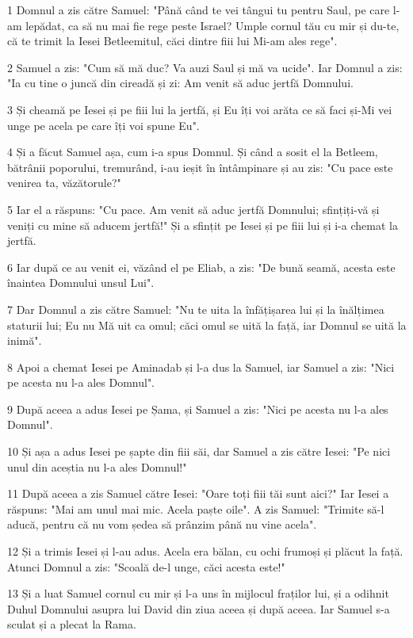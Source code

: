 \par 1 Domnul a zis către Samuel: "Până când te vei tângui tu pentru Saul, pe care l-am lepădat, ca să nu mai fie rege peste Israel? Umple cornul tău cu mir și du-te, că te trimit la Iesei Betleemitul, căci dintre fiii lui Mi-am ales rege".
\par 2 Samuel a zis: "Cum să mă duc? Va auzi Saul și mă va ucide". Iar Domnul a zis: "Ia cu tine o juncă din cireadă și zi: Am venit să aduc jertfă Domnului.
\par 3 Și cheamă pe Iesei și pe fiii lui la jertfă, și Eu îți voi arăta ce să faci și-Mi vei unge pe acela pe care îți voi spune Eu".
\par 4 Și a făcut Samuel așa, cum i-a spus Domnul. Și când a sosit el la Betleem, bătrânii poporului, tremurând, i-au ieșit în întâmpinare și au zis: "Cu pace este venirea ta, văzătorule?"
\par 5 Iar el a răspuns: "Cu pace. Am venit să aduc jertfă Domnului; sfințiți-vă și veniți cu mine să aducem jertfă!" Și a sfințit pe Iesei și pe fiii lui și i-a chemat la jertfă.
\par 6 Iar după ce au venit ei, văzând el pe Eliab, a zis: "De bună seamă, acesta este înaintea Domnului unsul Lui".
\par 7 Dar Domnul a zis către Samuel: "Nu te uita la înfățișarea lui și la înălțimea staturii lui; Eu nu Mă uit ca omul; căci omul se uită la față, iar Domnul se uită la inimă".
\par 8 Apoi a chemat Iesei pe Aminadab și l-a dus la Samuel, iar Samuel a zis: "Nici pe acesta nu l-a ales Domnul".
\par 9 După aceea a adus Iesei pe Șama, și Samuel a zis: "Nici pe acesta nu l-a ales Domnul".
\par 10 Și așa a adus Iesei pe șapte din fiii săi, dar Samuel a zis către Iesei: "Pe nici unul din aceștia nu l-a ales Domnul!"
\par 11 După aceea a zis Samuel către Iesei: "Oare toți fiii tăi sunt aici?" Iar Iesei a răspuns: "Mai am unul mai mic. Acela paște oile". A zis Samuel: "Trimite să-l aducă, pentru că nu vom ședea să prânzim până nu vine acela".
\par 12 Și a trimis Iesei și l-au adus. Acela era bălan, cu ochi frumoși și plăcut la față. Atunci Domnul a zis: "Scoală de-l unge, căci acesta este!"
\par 13 Și a luat Samuel cornul cu mir și l-a uns în mijlocul fraților lui, și a odihnit Duhul Domnului asupra lui David din ziua aceea și după aceea. Iar Samuel s-a sculat și a plecat la Rama.

